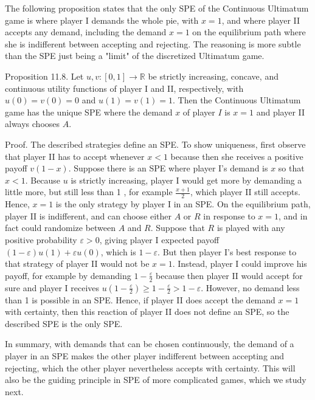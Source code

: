 \documentclass[12pt]{article}
\begin{document}
The following proposition states that the only SPE of the Continuous Ultimatum game is where player I demands the whole pie, with $x=1$, and where player II accepts any demand, including the demand $x=1$ on the equilibrium path where she is indifferent between accepting and rejecting. The reasoning is more subtle than the SPE just being a "limit" of the discretized Ultimatum game.

Proposition 11.8. Let $u, v:[0,1] \rightarrow \mathbb{R}$ be strictly increasing, concave, and continuous utility functions of player I and II, respectively, with $u(0)=v(0)=0$ and $u(1)=v(1)=1$. Then the Continuous Ultimatum game has the unique SPE where the demand $x$ of player $I$ is $x=1$ and player II always chooses $A$.

Proof. The described strategies define an SPE. To show uniqueness, first observe that player II has to accept whenever $x<1$ because then she receives a positive payoff $v(1-x)$. Suppose there is an SPE where player I's demand is $x$ so that $x<1$. Because $u$ is strictly increasing, player I would get more by demanding a little more, but still less than 1 , for example $\frac{x+1}{2}$, which player II still accepts. Hence, $x=1$ is the only strategy by player I in an SPE. On the equilibrium path, player II is indifferent, and can choose either $A$ or $R$ in response to $x=1$, and in fact could randomize between $A$ and $R$. Suppose that $R$ is played with any positive probability $\varepsilon>0$, giving player I expected payoff $(1-\varepsilon) u(1)+\varepsilon u(0)$, which is $1-\varepsilon$. But then player I's best response to that strategy of player II would not be $x=1$. Instead, player I could improve his payoff, for example by demanding $1-\frac{\varepsilon}{2}$ because then player II would accept for sure and player I receives $u\left(1-\frac{\varepsilon}{2}\right) \geq 1-\frac{\varepsilon}{2}>1-\varepsilon$. However, no demand less than 1 is possible in an SPE. Hence, if player II does accept the demand $x=1$ with certainty, then this reaction of player II does not define an SPE, so the described SPE is the only SPE.

In summary, with demands that can be chosen continuously, the demand of a player in an SPE makes the other player indifferent between accepting and rejecting, which the other player nevertheless accepts with certainty. This will also be the guiding principle in SPE of more complicated games, which we study next.
\end{document}
